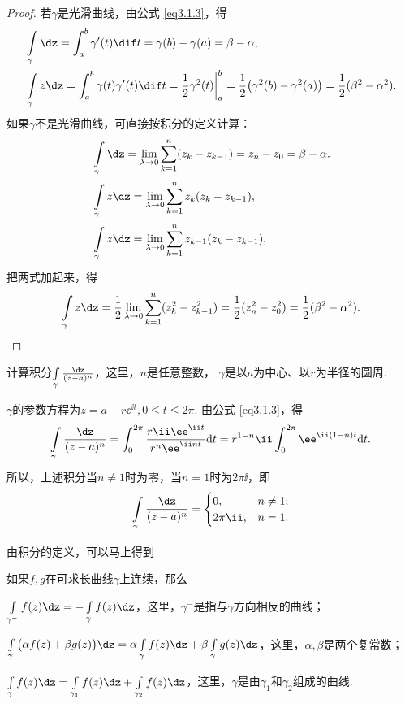 \begin{proof}
  若$\gamma$是光滑曲线，由公式 \eqref{eq3.1.3}，得
  \begin{align*}
    & \int\limits_\gamma \dz = \int_a^b\gamma'(t)\dif t=\gamma(b)-\gamma(a)=\beta-\alpha,\\
    & \int\limits_\gamma z\dz = \int_a^b\gamma(t)\gamma'(t)\dif t
      = \frac12\gamma^2(t)\bigg|_a^b = \frac12\big(\gamma^2(b)-\gamma^2(a)\big)
      = \frac12(\beta^2-\alpha^2).
  \end{align*}
  如果$\gamma$不是光滑曲线，可直接按积分的定义计算：
  \begin{align*}
  &\int\limits_\gamma\dz=\lim_{\lambda\to0}\sum_{k=1}^n(z_k-z_{k-1})
  =z_n-z_0=\beta-\alpha.\\
  &\int\limits_\gamma z\dz=\lim_{\lambda\to0}\sum_{k=1}^nz_k(z_k-z_{k-1}),\\
  &\int\limits_\gamma z\dz=\lim_{\lambda\to0}\sum_{k=1}^nz_{k-1}(z_k-z_{k-1}),
  \end{align*}
  把两式加起来，得
  \begin{equation*}
    \int\limits_\gamma z\dz=\frac12\lim_{\lambda\to0}
    \sum_{k=1}^n(z_k^2-z_{k-1}^2)=\frac12(z_n^2-z_0^2)=\frac12(\beta^2-\alpha^2).
  \end{equation*}
\end{proof}

\begin{example}\label{exam3.1.4}
计算积分$\int\limits_\gamma\frac{\dz}{(z-a)^n}$，这里，$n$是任意整数，
$\gamma$是以$a$为中心、以$r$为半径的圆周.
\end{example}
\begin{solution}
$\gamma$的参数方程为$z=a+r\ee^{\ii t},0\le t\le2\pi$. 由公式 \eqref{eq3.1.3}，得
\[\int\limits_\gamma\frac{\dz}{(z-a)^n}=\int_0^{2\pi}\frac{r\ii\ee^{\ii t}}{r^n\ee^{\ii nt}}\textrm dt=r^{1-n}\ii\int_0^{2\pi}\ee^{\ii(1-n)t}\textrm dt.\]
所以，上述积分当$n\ne1$时为零，当$n=1$时为$2\pi\ii$，即
\begin{equation*}\int\limits_\gamma\frac{\dz}{(z-a)^n}=\begin{cases}
0,&n\ne1;\\
2\pi\ii,&n=1.
\end{cases}
\end{equation*}
\end{solution}

由积分的定义，可以马上得到
\begin{prop}\label{prop3.1.5}
如果$f,g$在可求长曲线$\gamma$上连续，那么
\begin{eenum}
  \item \label{prop3.1.5.1} $\int\limits_{\gamma^-}f(z)\dz=-\int\limits_\gamma f(z)\dz$，这里，$\gamma^-$是指与$\gamma$方向相反的曲线；
  \item \label{prop3.1.5.2} $\int\limits_\gamma\big(\alpha f(z)+\beta g(z)\big)\dz
  =\alpha\int\limits_\gamma f(z)\dz+\beta\int\limits_\gamma g(z)\dz$，这里，$\alpha,\beta$是两个复常数；
  \item \label{prop3.1.5.3} $\int\limits_\gamma f(z)\dz=\int\limits_{\gamma_1}f(z)\dz+\int\limits_{\gamma_2}f(z)\dz$，这里，$\gamma$是由$\gamma_1$和$\gamma_2$组成的曲线.
\end{eenum}
\end{prop}


